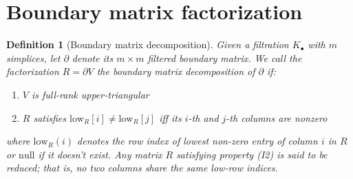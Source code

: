 \documentclass[12pt]{article}
\numberwithin{equation}{section}
\newcommand{\+}{%
	\raisebox{0.18ex}{\scaleobj{0.55}{+}}
}
\newtheorem{definition}{Definition}
\theoremstyle{definition}
\begin{document}






\appendix

\section{Boundary matrix factorization}
\begin{definition}[Boundary matrix decomposition]
Given a filtration $K_\bullet$ with $m$ simplices, let $\partial$ denote its $m \times m$ filtered boundary matrix. We call the factorization $R = \partial V$ the \emph{boundary matrix decomposition} of $\partial$ if:
 \begin{enumerate}[labelsep=3pt, topsep=3pt, itemsep=-0.10ex,parsep=1.2ex]
 	\item[I1.] $V$ is full-rank upper-triangular
 	\item[I2.] $R$ satisfies $\mathrm{low}_R[i] \neq \mathrm{low}_R[j]$ iff its $i$-th and $j$-th columns are nonzero
 	\end{enumerate} 
 	where $\mathrm{low}_R(i)$ denotes the row index of lowest non-zero entry of column $i$ in $R$ or $\mathrm{null}$ if it doesn't exist. Any matrix $R$ satisfying property (I2) is said to be  \emph{reduced}; that is, no two columns share the same low-row indices.
\end{definition}
\end{document}
